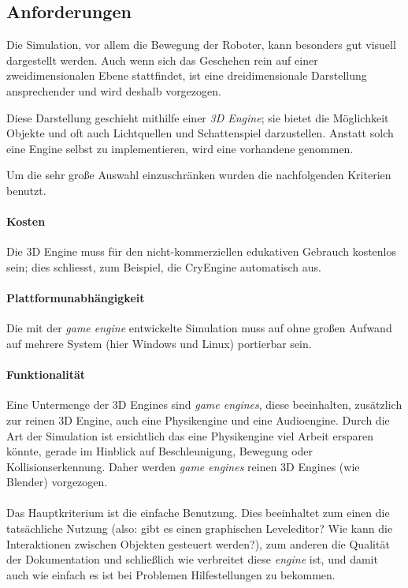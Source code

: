 \documentclass[
    12pt,
    bibliography=totoc,
    ngerman,
	enabledeprecatedfontcommands
]{scrartcl}
\begin{document}
\subsection{Anforderungen}
Die Simulation, vor allem die Bewegung der Roboter, kann besonders gut visuell dargestellt werden. Auch wenn sich das Geschehen rein auf einer zweidimensionalen Ebene stattfindet, ist eine dreidimensionale
Darstellung ansprechender und wird deshalb vorgezogen.

Diese Darstellung geschieht mithilfe einer \textit{3D Engine}; sie bietet die M{\"{o}}glichkeit Objekte und oft auch Lichtquellen und Schattenspiel darzustellen.
Anstatt solch eine Engine selbst zu implementieren, wird eine vorhandene genommen.

Um die sehr gro{\ss}e Auswahl einzuschr{\"{a}}nken wurden die nachfolgenden Kriterien benutzt.

\paragraph{Kosten} Die 3D Engine muss f{\"{u}}r den nicht-kommerziellen edukativen Gebrauch kostenlos sein; dies schliesst, zum Beispiel, die CryEngine\cite{cryengine} automatisch aus.

\paragraph{Plattformunabh{\"{a}}ngigkeit} Die mit der \textit{game engine} entwickelte Simulation muss auf ohne gro{\ss}en Aufwand auf mehrere System (hier Windows und Linux) portierbar sein.

\paragraph{Funktionalit{\"{a}}t} Eine Untermenge der 3D Engines sind \textit{game engines}, diese beeinhalten, zus{\"{a}}tzlich zur reinen 3D Engine, auch eine Physikengine und eine Audioengine.
Durch die Art der Simulation ist ersichtlich das eine Physikengine viel Arbeit ersparen k{\"{o}}nnte, gerade im Hinblick auf Beschleunigung, Bewegung oder Kollisionserkennung. Daher werden \textit{game engines} reinen 3D Engines (wie Blender) vorgezogen.

\paragraph{} Das Hauptkriterium ist die einfache Benutzung. Dies beeinhaltet zum einen die
tats{\"{a}}chliche Nutzung (also: gibt es einen graphischen Leveleditor? Wie kann die Interaktionen zwischen
Objekten gesteuert werden?), zum anderen die Qualit{\"{a}}t der Dokumentation und schließlich wie verbreitet diese
\textit{engine} ist, und damit auch wie einfach es ist bei Problemen Hilfestellungen zu bekommen.
\end{document}
